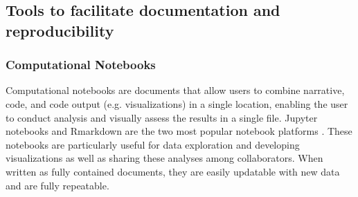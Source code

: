 \documentclass[10pt,letterpaper]{article}
\begin{document}


\subsection*{Tools to facilitate documentation and reproducibility}

\subsubsection*{Computational Notebooks} 

Computational notebooks are documents that allow users to combine narrative, code, and code output (e.g. visualizations) in a single location, enabling the user to conduct analysis and visually assess the results in a single file.
Jupyter notebooks and Rmarkdown are the two most popular notebook platforms \cite{kluyver2016jupyter, allaire2018rmarkdown}. 
These notebooks are particularly useful for data exploration and developing visualizations as well as sharing these analyses among collaborators. 
When written as fully contained documents, they are easily updatable with new data and are fully repeatable. 

\end{document}
